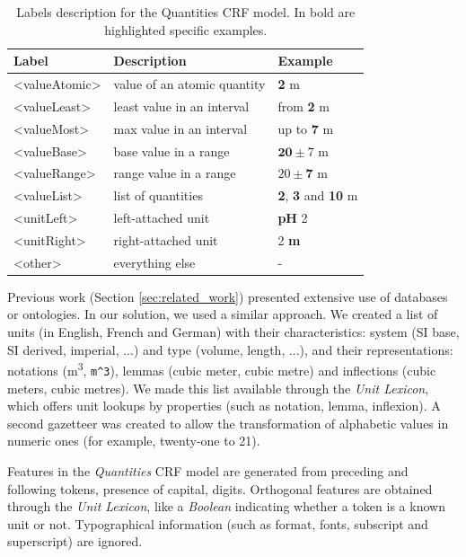 \documentclass[sigconf]{acmart}
\begin{document}
\begin{table}[ht]
  \caption{Labels description for the Quantities CRF model. In bold are highlighted specific examples.}
  \label{tab:quantities-model-labels}
  \begin{tabular}{lll}
    \toprule
    Label & Description & Example\\
    \midrule
    <valueAtomic> & value of an atomic quantity & \textbf{2} m \\
    <valueLeast> & least value in an interval & from \textbf{2} m \\
    <valueMost> & max value in an interval & up to \textbf{7} m \\
    <valueBase> & base value in a range & $\textbf{20}\pm7$ m \\
    <valueRange> & range value in a range & $20 \pm \textbf{7}$ m \\
    <valueList> & list of quantities & \textbf{2}, \textbf{3} and \textbf{10} m \\
    <unitLeft> & left-attached unit & \textbf{pH} 2 \\
    <unitRight> & right-attached unit & 2 \textbf{m} \\
    <other> & everything else & - \\
  \bottomrule
\end{tabular}
\end{table}

Previous work (Section \ref{sec:related_work}) presented extensive use of databases or ontologies. In our solution, we used a similar approach. We created a list of units (in English, French and German) with their characteristics: system (SI base, SI derived, imperial, ...) and type (volume, length, ...), and their representations: notations (m\textsuperscript{3}, \texttt{m\^{}3}), lemmas (cubic meter, cubic metre) and inflections (cubic meters, cubic metres). We made this list available through the \textit{Unit Lexicon}, which offers unit lookups by properties (such as notation, lemma, inflexion). A second gazetteer was created to allow the transformation of alphabetic values in numeric ones (for example, twenty-one to 21).

Features in the \textit{Quantities} CRF model are generated from preceding and following tokens, presence of capital, digits. Orthogonal features are obtained through the \textit{Unit Lexicon}, like a \textit{Boolean} indicating whether a token is a known unit or not. Typographical information (such as format, fonts, subscript and superscript) are ignored. 
\end{document}
